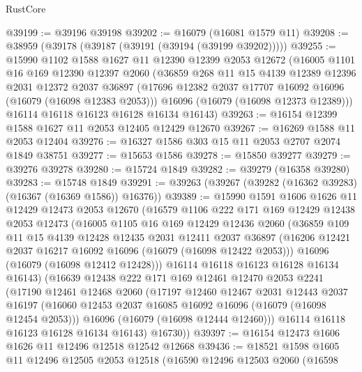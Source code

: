\begin{lexlean}{RustCore}
\begin{coremodule}
@39199 := @39196 @39198
@39202 := @16079 (@16081 @1579 @11)
@39208 := @38959 (@39178 (@39187 (@39191 (@39194 (@39199 @39202)))))
@39255 := @15990
    @1102
    @1588
    @1627
    @11
    @12390
    @12399
    @2053
    @12672
    (@16005
      @1101
      @16
      @169
      @12390
      @12397
      @2060
      (@36859
        @268
        @11
        @15
        @4139
        @12389
        @12396
        @2031
        @12372
        @2037
        @36897
        (@17696 @12382 @2037 @17707 @16092 @16096 (@16079 (@16098 @12383 @2053)))
        @16096
        (@16079 (@16098 @12373 @12389)))
      @16114
      @16118
      @16123
      @16128
      @16134
      @16143)
@39263 := @16154 @12399 @1588 @1627 @11 @2053 @12405 @12429 @12670
@39267 := @16269 @1588 @11 @2053 @12404
@39276 := @16327 @1586 @303 @15 @11 @2053 @2707 @2074 @1849 @38751
@39277 := @15653 @1586
@39278 := @15850 @39277
@39279 := @39276 @39278
@39280 := @15724 @1849
@39282 := @39279 (@16358 @39280)
@39283 := @15748 @1849
@39291 := @39263 (@39267 (@39282 (@16362 @39283) (@16367 (@16369 @1586)) @16376))
@39389 := @15990
    @1591
    @1606
    @1626
    @11
    @12429
    @12473
    @2053
    @12670
    (@16579
      @1106
      @222
      @171
      @169
      @12429
      @12438
      @2053
      @12473
      (@16005
        @1105
        @16
        @169
        @12429
        @12436
        @2060
        (@36859
          @109
          @11
          @15
          @4139
          @12428
          @12435
          @2031
          @12411
          @2037
          @36897
          (@16206 @12421 @2037 @16217 @16092 @16096 (@16079 (@16098 @12422 @2053)))
          @16096
          (@16079 (@16098 @12412 @12428)))
        @16114
        @16118
        @16123
        @16128
        @16134
        @16143)
      (@16639
        @12438
        @222
        @171
        @169
        @12461
        @12470
        @2053
        @2241
        (@17190
          @12461
          @12468
          @2060
          (@17197
            @12460
            @12467
            @2031
            @12443
            @2037
            @16197
            (@16060 @12453 @2037 @16085 @16092 @16096 (@16079 (@16098 @12454 @2053)))
            @16096
            (@16079 (@16098 @12444 @12460)))
          @16114
          @16118
          @16123
          @16128
          @16134
          @16143)
        @16730))
@39397 := @16154 @12473 @1606 @1626 @11 @12496 @12518 @12542 @12668
@39436 := @18521
    @1598
    @1605
    @11
    @12496
    @12505
    @2053
    @12518
    (@16590
      @12496
      @12503
      @2060
      (@16598

\end{coremodule}
\end{lexlean}
